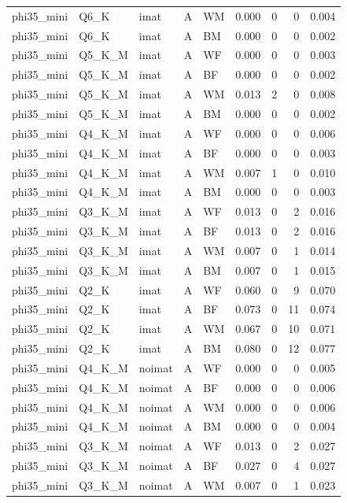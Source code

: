 \begin{tabular}{lllllrrrr}
phi35\_mini & Q6\_K & imat & A & WM & 0.000 & 0 & 0 & 0.004 \\
phi35\_mini & Q6\_K & imat & A & BM & 0.000 & 0 & 0 & 0.002 \\
phi35\_mini & Q5\_K\_M & imat & A & WF & 0.000 & 0 & 0 & 0.003 \\
phi35\_mini & Q5\_K\_M & imat & A & BF & 0.000 & 0 & 0 & 0.002 \\
phi35\_mini & Q5\_K\_M & imat & A & WM & 0.013 & 2 & 0 & 0.008 \\
phi35\_mini & Q5\_K\_M & imat & A & BM & 0.000 & 0 & 0 & 0.002 \\
phi35\_mini & Q4\_K\_M & imat & A & WF & 0.000 & 0 & 0 & 0.006 \\
phi35\_mini & Q4\_K\_M & imat & A & BF & 0.000 & 0 & 0 & 0.003 \\
phi35\_mini & Q4\_K\_M & imat & A & WM & 0.007 & 1 & 0 & 0.010 \\
phi35\_mini & Q4\_K\_M & imat & A & BM & 0.000 & 0 & 0 & 0.003 \\
phi35\_mini & Q3\_K\_M & imat & A & WF & 0.013 & 0 & 2 & 0.016 \\
phi35\_mini & Q3\_K\_M & imat & A & BF & 0.013 & 0 & 2 & 0.016 \\
phi35\_mini & Q3\_K\_M & imat & A & WM & 0.007 & 0 & 1 & 0.014 \\
phi35\_mini & Q3\_K\_M & imat & A & BM & 0.007 & 0 & 1 & 0.015 \\
phi35\_mini & Q2\_K & imat & A & WF & 0.060 & 0 & 9 & 0.070 \\
phi35\_mini & Q2\_K & imat & A & BF & 0.073 & 0 & 11 & 0.074 \\
phi35\_mini & Q2\_K & imat & A & WM & 0.067 & 0 & 10 & 0.071 \\
phi35\_mini & Q2\_K & imat & A & BM & 0.080 & 0 & 12 & 0.077 \\
phi35\_mini & Q4\_K\_M & noimat & A & WF & 0.000 & 0 & 0 & 0.005 \\
phi35\_mini & Q4\_K\_M & noimat & A & BF & 0.000 & 0 & 0 & 0.006 \\
phi35\_mini & Q4\_K\_M & noimat & A & WM & 0.000 & 0 & 0 & 0.006 \\
phi35\_mini & Q4\_K\_M & noimat & A & BM & 0.000 & 0 & 0 & 0.004 \\
phi35\_mini & Q3\_K\_M & noimat & A & WF & 0.013 & 0 & 2 & 0.027 \\
phi35\_mini & Q3\_K\_M & noimat & A & BF & 0.027 & 0 & 4 & 0.027 \\
phi35\_mini & Q3\_K\_M & noimat & A & WM & 0.007 & 0 & 1 & 0.023 \\

\end{tabular}
